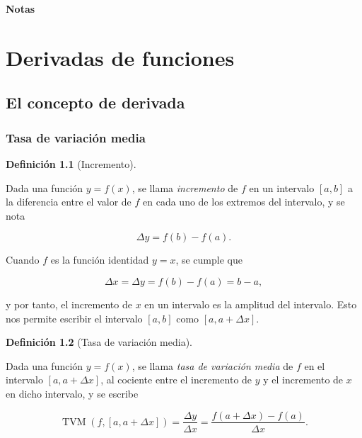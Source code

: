 \documentclass[
  a4paper,
]{scrreport}
\theoremstyle{plain}
\theoremstyle{plain}
\theoremstyle{definition}
\newtheorem{definition}{Definición}[chapter]
\theoremstyle{plain}
\theoremstyle{definition}
\theoremstyle{remark}
\begin{document}
\textbf{Notas}


\hypertarget{derivadas-de-funciones}{%
\chapter{Derivadas de funciones}\label{derivadas-de-funciones}}

\hypertarget{el-concepto-de-derivada}{%
\section{El concepto de derivada}\label{el-concepto-de-derivada}}

\hypertarget{tasa-de-variaciuxf3n-media}{%
\subsection{Tasa de variación media}\label{tasa-de-variaciuxf3n-media}}

\leavevmode{}%
\begin{definition}[Incremento]\label{def-incremento}

Dada una función \(y=f(x)\), se llama \emph{incremento} de \(f\) en un
intervalo \([a,b]\) a la diferencia entre el valor de \(f\) en cada uno
de los extremos del intervalo, y se nota

\[\Delta y= f(b)-f(a).\]

\end{definition}

Cuando \(f\) es la función identidad \(y=x\), se cumple que

\[\Delta x=\Delta y= f(b)-f(a)=b-a,\]

y por tanto, el incremento de \(x\) en un intervalo es la amplitud del
intervalo. Esto nos permite escribir el intervalo \([a,b]\) como
\([a,a+\Delta x]\).

\leavevmode{}%
\begin{definition}[Tasa de variación
media]\label{def-tasa-variacion-media}

Dada una función \(y=f(x)\), se llama \emph{tasa de variación media} de
\(f\) en el intervalo \([a,a+\Delta x]\), al cociente entre el
incremento de \(y\) y el incremento de \(x\) en dicho intervalo, y se
escribe

\[
\operatorname{TVM}(f,[a,a+\Delta x])=\frac{\Delta y}{\Delta x}=\frac{f(a+\Delta x)-f(a)}{\Delta x}.
\]

\end{definition}
\end{document}
